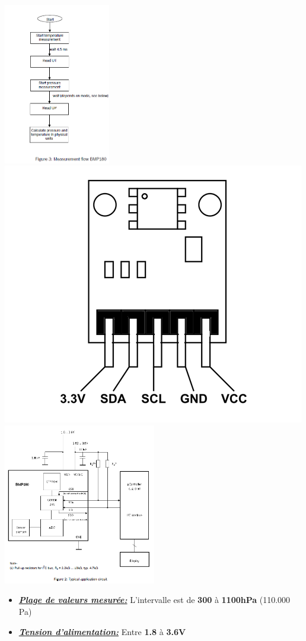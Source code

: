 \documentclass[a4paper,12pt]{report}
\begin{document}
\centering
\includegraphics[width=0.35\textwidth]{2.png}
\hspace{2cm} 
\includegraphics[width=0.20 \textwidth]{BMP180-Sensor-Pinout.png}
\includegraphics[width=0.50\textwidth]{sblck.png}

\vspace{3cm}
\hfill

\begin{itemize}
\vspace{2cm}
\setlength{\itemindent}{2cm}
\item \underline{\textit{\textbf{Plage de valeurs mesurée:}}} L'intervalle est de \textbf{300} à \textbf{1100hPa} (110.000 Pa)
\end{itemize} 

\begin{itemize}
\setlength{\itemindent}{2cm}
\item \underline{\textit{\textbf{Tension d'alimentation:}}} Entre \textbf{1.8} à \textbf{3.6V} 
\end{itemize} 
\end{document}
